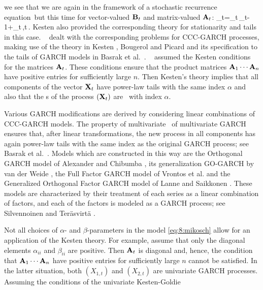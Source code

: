 we see that we are again in the framework of a stochastic recurrence equation\ 
but this time for vector-valued ${\mathbf B}_t$ and matrix-valued ${\mathbf A}_t$:
\beam\label{eq:jan6b:mikosch}
\bfY_t=\bfA_t\,\bfY_{t-1}+\bfB_t\,,\qquad t\in\bbz\,.
\eeam
Kesten \cite{kesten:1973} also provided the corresponding theory  
for stationarity and tails in this case. \sta\ \cite{starica:1999}
dealt with the corresponding problems for CCC-GARCH processes,
making use of the theory in Kesten \cite{kesten:1973},
Bougerol and Picard \cite{bougerol:picard:1992}
and its
specification to the tails of GARCH models 
in Basrak et al.~\cite{basrak:davis:mikosch:2002}. \sta\ \cite{starica:1999} assumed the 
Kesten conditions for the matrices ${\mathbf A}_t$. These conditions ensure
that the product matrices ${\mathbf A}_1\cdots{\mathbf A}_n$ have positive entries
for sufficiently large $n$. Then Kesten's theory implies that all
components of the vector ${\mathbf X}_t$ have power-law tails with the same
index $\alpha$ and also that the \fidi s of the process $({\mathbf X}_t)$ are
\regvary\ with index $\alpha$.
\par
Various GARCH modifications are derived by considering linear
combinations of CCC-GARCH models. The property of multivariate
\regvar\ of multivariate GARCH ensures that, after linear
transformations,  the new process in all components has again
power-law tails with the same index as the original GARCH process; see
Basrak et al.~\cite{basrak:davis:mikosch:2002}.
Models which are constructed in this way are
the Orthogonal GARCH model of
Alexander and Chibumba \cite{alexander:chibumba:1996}, its
generalization GO-GARCH by van der Weide \cite{Weide2002},  the Full
Factor GARCH model of Vrontos et al. \cite{vrontos2003full} and the
Generalized Orthogonal Factor GARCH model of Lanne and Saikkonen
\cite{lanne2007modelling}. These models are characterized by their
treatment of each series as a linear combination of factors, and each
of the factors is modeled as a GARCH process; see Silvennoinen and
Ter\"asvirt\"a \cite{silventeras:2009}.
\par
Not all choices of $\alpha$- and $\beta$-parameters in the model
\eqref{eq:8:mikosch} allow for an application of the Kesten theory. For
example, assume that only the diagonal elements $\alpha_{ii}$ and
$\beta_{ii}$ are positive. Then ${\mathbf A}_t$ is diagonal and, hence, the
condition that ${\mathbf A}_1\cdots{\mathbf A}_n$ have positive entries for
sufficiently large $n$  cannot be satisfied. In the latter situation,
both $(X_{1,t})$ and $(X_{2,t})$ are univariate GARCH
processes. Assuming the  conditions of the univariate Kesten-Goldie
